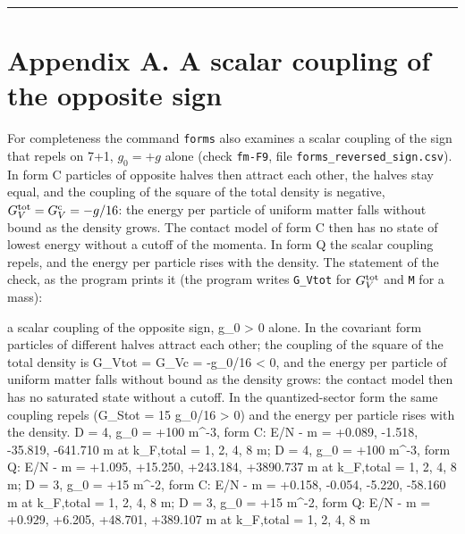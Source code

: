 \documentclass[
  10pt,
]{article}
\newenvironment{Shaded}{}{}
\newcommand{\NormalTok}[1]{#1}
\begin{document}
\begin{center}\rule{0.5\linewidth}{0.5pt}\end{center}

\hypertarget{appendix-a.-a-scalar-coupling-of-the-opposite-sign}{%
\section{Appendix A. A scalar coupling of the opposite
sign}\label{appendix-a.-a-scalar-coupling-of-the-opposite-sign}}

For completeness the command \texttt{forms} also examines a scalar
coupling of the sign that repels on 7+1, \(g_0=+g\) alone (check
\texttt{fm-F9}, file \texttt{forms\_reversed\_sign.csv}). In form C
particles of opposite halves then attract each other, the halves stay
equal, and the coupling of the square of the total density is negative,
\(G_V^{\rm tot}=G_V^{\rm c}=-g/16\): the energy per particle of uniform
matter falls without bound as the density grows. The contact model of
form C then has no state of lowest energy without a cutoff of the
momenta. In form Q the scalar coupling repels, and the energy per
particle rises with the density. The statement of the check, as the
program prints it (the program writes \texttt{G\_Vtot} for
\(G_V^{\rm tot}\) and \texttt{M} for a mass):

\begin{Shaded}
\begin{Highlighting}[]
\NormalTok{a scalar coupling of the opposite sign, g\_0 \textgreater{} 0 alone. In the covariant form particles of different halves attract each other; the coupling of the square of the total density is G\_Vtot = G\_Vc = {-}g\_0/16 \textless{} 0, and the energy per particle of uniform matter falls without bound as the density grows: the contact model then has no saturated state without a cutoff. In the quantized{-}sector form the same coupling repels (G\_Stot = 15 g\_0/16 \textgreater{} 0) and the energy per particle rises with the density. D = 4, g\_0 = +100 m\^{}{-}3, form C: E/N {-} m = +0.089, {-}1.518, {-}35.819, {-}641.710 m at k\_F,total = 1, 2, 4, 8 m; D = 4, g\_0 = +100 m\^{}{-}3, form Q: E/N {-} m = +1.095, +15.250, +243.184, +3890.737 m at k\_F,total = 1, 2, 4, 8 m; D = 3, g\_0 = +15 m\^{}{-}2, form C: E/N {-} m = +0.158, {-}0.054, {-}5.220, {-}58.160 m at k\_F,total = 1, 2, 4, 8 m; D = 3, g\_0 = +15 m\^{}{-}2, form Q: E/N {-} m = +0.929, +6.205, +48.701, +389.107 m at k\_F,total = 1, 2, 4, 8 m}
\end{Highlighting}
\end{Shaded}
\end{document}
